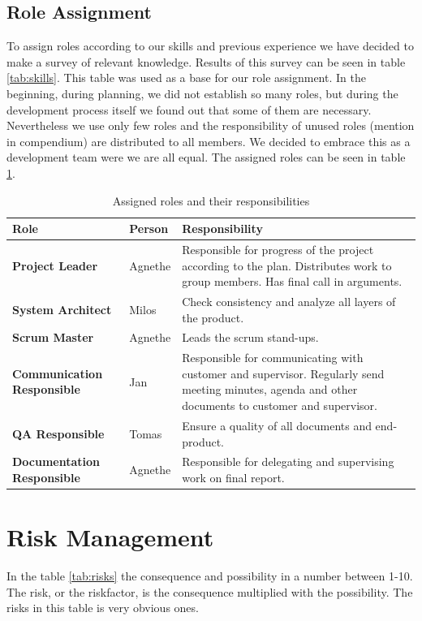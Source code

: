 \subsection{Role Assignment}
To assign roles according to our skills and previous experience we have decided to make a survey of relevant knowledge. 
Results of this survey can be seen in table \ref{tab:skills}. 
This table was used as a base for our role assignment.
In the beginning, during planning, we did not establish so many roles, but during the development process itself we found out that some of them are necessary. 
Nevertheless we use only few roles and the responsibility of unused roles (mention in compendium) are distributed to all members. 
We decided to embrace this as a development team were we are all equal.
The assigned roles can be seen in table \ref{tab:roles}. 

\begin{table}\centering {}
    \caption{Assigned roles and their responsibilities}
    \label{tab:roles}
    \vspace{2mm}
    \begin{tabularx}{\textwidth}{llX}
    \toprule
    Role    & Person   & Responsibility \\
    \midrule
    \textbf{Project Leader}             & Agnethe &
        Responsible for progress of the project according to the plan.
        Distributes work to group members.
        Has final call in arguments.\\
    \textbf{System Architect}             & Milos &
        Check consistency and analyze all layers of the product. \\
    \textbf{Scrum Master}             & Agnethe &
        Leads the scrum stand-ups. \\
    \textbf{Communication Responsible}  & Jan &
        Responsible for communicating with customer and supervisor.
        Regularly send meeting minutes, agenda and other documents to customer and supervisor. \\ 
    \textbf{QA Responsible} & Tomas &
        Ensure a quality of all documents and end-product.        \\ 
    \textbf{Documentation Responsible} & Agnethe &
        Responsible for delegating and supervising work on final report.        \\         
    \bottomrule
    \end{tabularx}
\end{table}

\section{Risk Management}
In the table \ref{tab:risks} the consequence and possibility in a number between 1-10. The risk, or the riskfactor, is the consequence multiplied with the possibility. The risks in this table is very obvious ones. 

